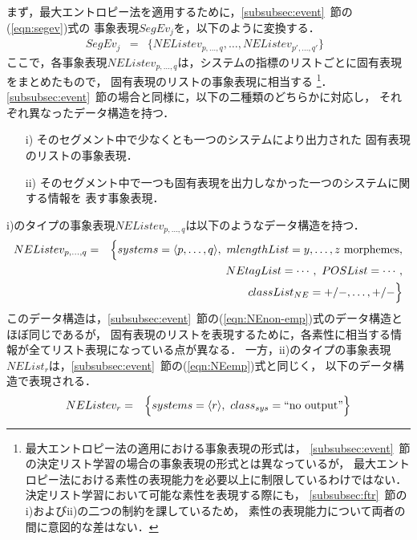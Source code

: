 まず，最大エントロピー法を適用するために，\ref{subsubsec:event}~節の(\ref{eqn:segev})式の
事象表現$SegEv_j$を，以下のように変換する．
\begin{eqnarray}
 SegEv_j & = & \{ NEListev_{p,\ldots,q},\ldots,NEListev_{p',\ldots,q'} \}\ \ \  \label{eqn:segev-ME}
\end{eqnarray}
ここで，各事象表現$NEListev_{p,\ldots,q}$は，システムの指標のリストごとに固有表現をまとめたもので，
固有表現のリストの事象表現に相当する
\footnote{
  最大エントロピー法の適用における事象表現の形式は，
  \ref{subsubsec:event}~節の決定リスト学習の場合の事象表現の形式とは異なっているが，
  最大エントロピー法における素性の表現能力を必要以上に制限しているわけではない．
  決定リスト学習において可能な素性を表現する際にも，
  \ref{subsubsec:ftr}~節のi)およびii)の二つの制約を課しているため，
  素性の表現能力について両者の間に意図的な差はない．
}．
\ref{subsubsec:event}~節の場合と同様に，以下の二種類のどちらかに対応し，
それぞれ異なったデータ構造を持つ．
\begin{enumerate}
\item[i)] そのセグメント中で少なくとも一つのシステムにより出力された
	固有表現のリストの事象表現．
\item[ii)] そのセグメント中で一つも固有表現を出力しなかった一つのシステムに関する情報を
	表す事象表現．
\end{enumerate}
i)のタイプの事象表現$NEListev_{p,\ldots,q}$は以下のようなデータ構造を持つ．
\begin{eqnarray}
NEListev_{p,\ldots,q} & = &	\Bigl\{
	 systems =
	 \langle p,\ldots,q\rangle,\ 
mlengthList = y,\ldots,z\mbox{ morphemes},\nonumber \\
& &	 \ \  NEtagList = \cdots,\ 
  		 POSList = \cdots,\nonumber \\
 & &  		 \ \ 
classList_{NE} = +/-,\ldots,+/-
	 \Bigr\} 
\label{eqn:NEnon-emp-ME}
\end{eqnarray}
このデータ構造は，\ref{subsubsec:event}~節の(\ref{eqn:NEnon-emp})式のデータ構造とほぼ同じであるが，
固有表現のリストを表現するために，各素性に相当する情報が全てリスト表現になっている点が異なる．
一方，ii)のタイプの事象表現$NEList_{r}$は，\ref{subsubsec:event}~節の(\ref{eqn:NEemp})式と同じく，
以下のデータ構造で表現される．
\begin{eqnarray}
NEListev_{r} & = &   	
       \Bigl\{
	 systems =
	 \langle r\rangle,\ 
class_{sys} =
	 \mbox{``no output''}
	 \Bigr\} \label{eqn:NEemp-ME}
\end{eqnarray}


